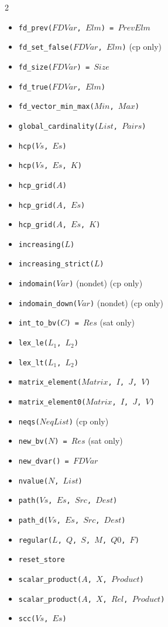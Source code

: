 \documentclass[10pt]{article}
\begin{document}
\begin{multicols}{2}
\begin{scriptsize}
\begin{itemize}
\item \texttt{fd\_prev($FDVar$, $Elm$) = $PrevElm$}
\item \texttt{fd\_set\_false($FDVar$, $Elm$)} (cp only)
\item \texttt{fd\_size($FDVar$) = $Size$}
\item \texttt{fd\_true($FDVar$, $Elm$)}
\item \texttt{fd\_vector\_min\_max($Min$, $Max$)}
\item \texttt{global\_cardinality($List$, $Pairs$)}
\item \texttt{hcp($Vs$, $Es$)}
\item \texttt{hcp($Vs$, $Es$, $K$)}
\item \texttt{hcp\_grid($A$)}
\item \texttt{hcp\_grid($A$, $Es$)}
\item \texttt{hcp\_grid($A$, $Es$, $K$)}
\item \texttt{increasing($L$)}
\item \texttt{increasing\_strict($L$)}
\item \texttt{indomain($Var$)} (nondet) (cp only)
\item \texttt{indomain\_down($Var$)} (nondet) (cp only)
\item \texttt{int\_to\_bv($C$) = $Res$} (sat only)
\item \texttt{lex\_le($L_1$, $L_2$)}
\item \texttt{lex\_lt($L_1$, $L_2$)}
\item \texttt{matrix\_element($Matrix$, $I$, $J$, $V$)}
\item \texttt{matrix\_element0($Matrix$, $I$, $J$, $V$)}
\item \texttt{neqs($NeqList$)} (cp only)
\item \texttt{new\_bv($N$) = $Res$} (sat only)
\item \texttt{new\_dvar() = $FDVar$}
\item \texttt{nvalue($N$, $List$)}
\item \texttt{path($Vs$, $Es$, $Src$, $Dest$)}
\item \texttt{path\_d($Vs$, $Es$, $Src$, $Dest$)}
\item \texttt{regular($L$, $Q$, $S$, $M$, $Q0$, $F$)}
\item \texttt{reset\_store}
\item \texttt{scalar\_product($A$, $X$, $Product$)} 
\item \texttt{scalar\_product($A$, $X$, $Rel$, $Product$)}
\item \texttt{scc($Vs$, $Es$)}

\end{itemize}
\end{scriptsize}
\end{multicols}
\end{document}

